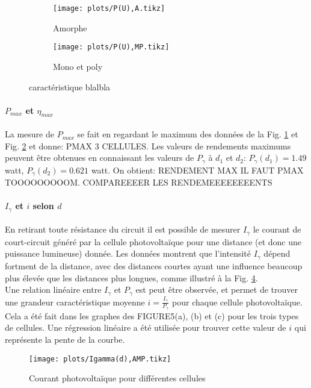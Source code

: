 \begin{figure}
    \centering
    \begin{subfigure}[c]{0.4\linewidth}
        \centering
        \texttt{[image: plots/P(U),A.tikz]}
        \caption{Amorphe}
        \label{plot:3a}        
    \end{subfigure}
    \begin{subfigure}[c]{0.4\linewidth}
        \centering
        \texttt{[image: plots/P(U),MP.tikz]}
        \caption{Mono et poly}
        \label{plot:3b}        
    \end{subfigure}
    \caption{caractéristique blalbla}
    \label{plot:3}
\end{figure}

\paragraph*{\(P_{max}\) et \(\eta_{max}\)}
La mesure de \(P_{max}\) se fait en regardant le maximum des données de la Fig. \ref{plot:3a} et Fig. \ref{plot:3b} et donne: PMAX 3 CELLULES. 
Les valeurs de rendements maximums peuvent être obtenues en connaissant les valeurs de \(P_\gamma\) à \(d_1\) et \(d_2\): \(P_\gamma (d_1) = 1.49\) \unit{watt}, \(P_\gamma (d_2) = 0.621\) \unit{watt}. On obtient: RENDEMENT MAX IL FAUT PMAX TOOOOOOOOOM.
COMPAREEEER LES RENDEMEEEEEEEENTS

\paragraph*{\(I_\gamma\) et \(i\) selon \(d\)}
En retirant toute résistance du circuit il est possible de mesurer \(I_\gamma\) le courant de court-circuit généré par la cellule photovoltaïque pour une distance (et donc une puissance lumineuse) donnée. Les données montrent que l'intensité \(I_\gamma\) dépend fortment de la distance, avec des distances courtes ayant une influence beaucoup plus élevée que les distances plus longues, comme illustré à la Fig. \ref{plot:4}. \\
Une relation linéaire entre \(I_\gamma\) et \(P_\gamma\) est peut être observée, et permet de trouver une grandeur caractéristique moyenne \(i = \frac{I_\gamma}{P_\gamma}\) pour chaque cellule photovoltaïque. Cela a été fait dans les graphes des FIGURE5(a), (b) et (c) pour les trois types de cellules. Une régression linéaire a été utilisée pour trouver cette valeur de \(i\) qui représente la pente de la courbe.

\begin{figure}
    \centering
    \texttt{[image: plots/Igamma(d),AMP.tikz]}
    \caption{Courant photovoltaïque pour différentes cellules}
    \label{plot:4}
\end{figure}

